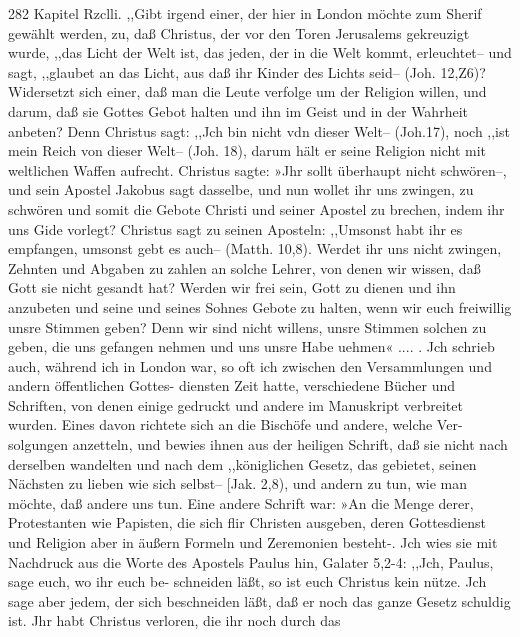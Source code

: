 282 Kapitel Rzclli.
,,Gibt irgend einer, der hier in London möchte zum Sherif
gewählt werden, zu, daß Christus, der vor den Toren Jerusalems
gekreuzigt wurde, ,,das Licht der Welt ist, das jeden, der in die
Welt kommt, erleuchtet-- und sagt, ,,glaubet an das Licht, aus daß
ihr Kinder des Lichts seid-- (Joh. 12,Z6)? Widersetzt sich einer,
daß man die Leute verfolge um der Religion willen, und darum, daß
sie Gottes Gebot halten und ihn im Geist und in der Wahrheit
anbeten? Denn Christus sagt: ,,Jch bin nicht vdn dieser Welt--
(Joh.17), noch ,,ist mein Reich von dieser Welt-- (Joh. 18), darum
hält er seine Religion nicht mit weltlichen Waffen aufrecht. Christus
sagte: »Jhr sollt überhaupt nicht schwören--, und sein Apostel
Jakobus sagt dasselbe, und nun wollet ihr uns zwingen, zu
schwören und somit die Gebote Christi und seiner Apostel zu
brechen, indem ihr uns Gide vorlegt? Christus sagt zu seinen
Aposteln: ,,Umsonst habt ihr es empfangen, umsonst gebt es
auch-- (Matth. 10,8). Werdet ihr uns nicht zwingen, Zehnten
und Abgaben zu zahlen an solche Lehrer, von denen wir wissen,
daß Gott sie nicht gesandt hat? Werden wir frei sein, Gott
zu dienen und ihn anzubeten und seine und seines Sohnes Gebote
zu halten, wenn wir euch freiwillig unsre Stimmen geben? Denn
wir sind nicht willens, unsre Stimmen solchen zu geben, die uns
gefangen nehmen und uns unsre Habe uehmen« .... .
Jch schrieb auch, während ich in London war, so oft ich
zwischen den Versammlungen und andern öffentlichen Gottes-
diensten Zeit hatte, verschiedene Bücher und Schriften, von denen
einige gedruckt und andere im Manuskript verbreitet wurden.
Eines davon richtete sich an die Bischöfe und andere, welche Ver-
solgungen anzetteln, und bewies ihnen aus der heiligen Schrift,
daß sie nicht nach derselben wandelten und nach dem ,,königlichen
Gesetz, das gebietet, seinen Nächsten zu lieben wie sich selbst--
[Jak. 2,8), und andern zu tun, wie man möchte, daß andere uns
tun. Eine andere Schrift war: »An die Menge derer, Protestanten
wie Papisten, die sich flir Christen ausgeben, deren Gottesdienst
und Religion aber in äußern Formeln und Zeremonien besteht-.
Jch wies sie mit Nachdruck aus die Worte des Apostels Paulus
hin, Galater 5,2-4: ,,Jch, Paulus, sage euch, wo ihr euch be-
schneiden läßt, so ist euch Christus kein nütze. Jch sage aber
jedem, der sich beschneiden läßt, daß er noch das ganze Gesetz
schuldig ist. Jhr habt Christus verloren, die ihr noch durch das


